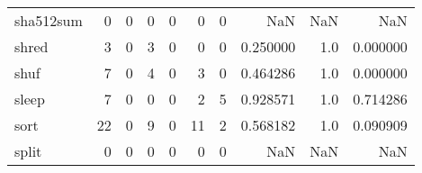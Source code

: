\begin{longtable}{lrrrrrrrrr}
sha512sum &                                                  0 &                                                  0 &                                                  0 &                                                  0 &                                                  0 &                                                  0 &                                                NaN &                                    NaN &                                  NaN \\
shred     &                                                  3 &                                                  0 &                                                  3 &                                                  0 &                                                  0 &                                                  0 &                                           0.250000 &                                    1.0 &                             0.000000 \\
shuf      &                                                  7 &                                                  0 &                                                  4 &                                                  0 &                                                  3 &                                                  0 &                                           0.464286 &                                    1.0 &                             0.000000 \\
sleep     &                                                  7 &                                                  0 &                                                  0 &                                                  0 &                                                  2 &                                                  5 &                                           0.928571 &                                    1.0 &                             0.714286 \\
sort      &                                                 22 &                                                  0 &                                                  9 &                                                  0 &                                                 11 &                                                  2 &                                           0.568182 &                                    1.0 &                             0.090909 \\
split     &                                                  0 &                                                  0 &                                                  0 &                                                  0 &                                                  0 &                                                  0 &                                                NaN &                                    NaN &                                  NaN \\

\end{longtable}
